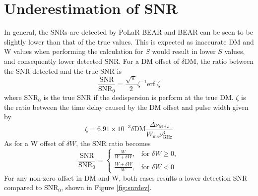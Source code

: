\section{Underestimation of SNR}

In general, the SNRs are detected by PoLaR BEAR and BEAR can be seen to be slightly lower than that of the true values. This is expected as inaccurate DM and W values when performing the calculation for $S$ would result in lower $S$ values, and consequently lower detected SNR. For a DM offset of $\delta$DM, the ratio between the SNR detected and the true SNR is \cite{Cordes2003}
\begin{equation}
    \frac{\text{SNR}}{\text{SNR}_0} = \frac{\sqrt{\pi}}{2} \zeta^{-1} \text{erf }\zeta
\end{equation}
where $\text{SNR}_0$ is the true SNR if the dedispersion is perform at the true DM. $\zeta$ is the ratio between the time delay caused by the DM offset and pulse width given by
\begin{equation}
    \zeta = 6.91 \times 10^{-3} \delta \text{DM} \frac{\Delta\nu_{\text{MHz}}}{W_{\text{ms}}\nu^3_{\text{GHz}}}
\end{equation}
As for a W offset of $\delta W$, the SNR ratio becomes \cite{Men2019}
\begin{equation}
    \frac{\text{SNR}}{\text{SNR}_0} = \begin{cases}\frac{W}{W+\delta W}, & \text{for }\delta W\geq 0, \\ \frac{W+\delta W}{W}, & \text{for }\delta W < 0\end{cases}
\end{equation}
For any non-zero offset in DM and W, both cases results a lower detection SNR compared to SNR$_0$, shown in Figure \ref{fig:snrdev}. 

